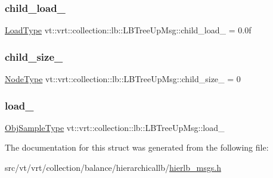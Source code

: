 \subsubsection{\texorpdfstring{child\+\_\+load\+\_\+}{child\_load\_}}
{\footnotesize\ttfamily \hyperlink{structvt_1_1vrt_1_1collection_1_1lb_1_1_l_b_tree_up_msg_a94e88fdd5142e26330a7feb8769de1bb}{Load\+Type} vt\+::vrt\+::collection\+::lb\+::\+L\+B\+Tree\+Up\+Msg\+::child\+\_\+load\+\_\+ = 0.\+0f\hspace{0.3cm}{\ttfamily [private]}}

\mbox{\label{structvt_1_1vrt_1_1collection_1_1lb_1_1_l_b_tree_up_msg_a3cf0b8cbf9a3669179119b40c2c38663}} 
\subsubsection{\texorpdfstring{child\+\_\+size\+\_\+}{child\_size\_}}
{\footnotesize\ttfamily \hyperlink{namespacevt_a866da9d0efc19c0a1ce79e9e492f47e2}{Node\+Type} vt\+::vrt\+::collection\+::lb\+::\+L\+B\+Tree\+Up\+Msg\+::child\+\_\+size\+\_\+ = 0\hspace{0.3cm}{\ttfamily [private]}}

\mbox{\label{structvt_1_1vrt_1_1collection_1_1lb_1_1_l_b_tree_up_msg_a9ed67bba04ee9261cb5d4a929170e28c}} 
\subsubsection{\texorpdfstring{load\+\_\+}{load\_}}
{\footnotesize\ttfamily \hyperlink{structvt_1_1vrt_1_1collection_1_1lb_1_1_hier_l_b_types_a597a60d517207b90e8c7984eac434e8f}{Obj\+Sample\+Type} vt\+::vrt\+::collection\+::lb\+::\+L\+B\+Tree\+Up\+Msg\+::load\+\_\+\hspace{0.3cm}{\ttfamily [private]}}



The documentation for this struct was generated from the following file\+:\begin{DoxyCompactItemize}
\item 
src/vt/vrt/collection/balance/hierarchicallb/\hyperlink{hierlb__msgs_8h}{hierlb\+\_\+msgs.\+h}\end{DoxyCompactItemize}
